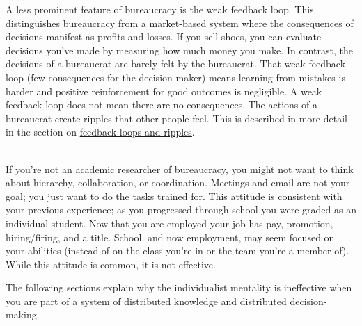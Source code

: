 A less prominent feature of bureaucracy is the weak 
\gls{feedback loop}. 
 \iftoggle{glossaryinmargin}{\marginpar{[Glossary]}}{}%
 This distinguishes bureaucracy from a market-based system where the consequences of decisions manifest as profits and losses. If you sell shoes, you can evaluate decisions you've made by measuring how much money you make. In contrast, the decisions of a bureaucrat are barely felt by the bureaucrat. That weak feedback loop (few consequences for the decision-maker) means learning from mistakes is harder and positive reinforcement for good outcomes is negligible. A weak feedback loop does not mean there are no consequences. The actions of a bureaucrat create ripples that other people feel. This is described in more detail in the section on \hyperref[sec:feedback-loop-and-ripples]{feedback loops and ripples}.

\ \\

If you're not an academic researcher of bureaucracy, you might not want to think about hierarchy, collaboration, or coordination. Meetings and email are not your goal; you just want to do the tasks trained for. This attitude is consistent with your previous experience; as you progressed through school you were graded as an individual student. Now that you are employed your job has pay, promotion, hiring/firing, and a title. School, and now employment, may seem focused on your abilities (instead of on the class you're in or the team you're a member of). While this attitude is common, it is not effective.

The following sections explain why the individualist mentality is ineffective when you are part of a system of distributed knowledge and distributed decision-making. 


